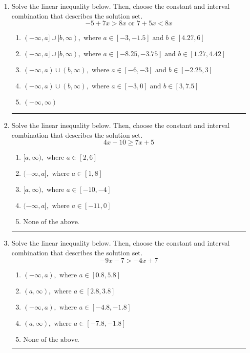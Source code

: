 \documentclass[14pt]{extbook}
\newcommand{\litem}[1]{\item#1\hspace*{-1cm}\rule{\textwidth}{0.4pt}}
\begin{document}
\begin{enumerate}
{\begin{enumerate}[label=\Alph*.]
\end{enumerate} }
\litem{
Solve the linear inequality below. Then, choose the constant and interval combination that describes the solution set.\[ -5 + 7 x > 8 x \text{ or } 7 + 5 x < 8 x \]\begin{enumerate}[label=\Alph*.]
\item \( (-\infty, a] \cup [b, \infty), \text{ where } a \in [-3, -1.5] \text{ and } b \in [4.27, 6] \)
\item \( (-\infty, a] \cup [b, \infty), \text{ where } a \in [-8.25, -3.75] \text{ and } b \in [1.27, 4.42] \)
\item \( (-\infty, a) \cup (b, \infty), \text{ where } a \in [-6, -3] \text{ and } b \in [-2.25, 3] \)
\item \( (-\infty, a) \cup (b, \infty), \text{ where } a \in [-3, 0] \text{ and } b \in [3, 7.5] \)
\item \( (-\infty, \infty) \)

\end{enumerate} }
\litem{
Solve the linear inequality below. Then, choose the constant and interval combination that describes the solution set.\[ 4x -10 \geq 7x + 5 \]\begin{enumerate}[label=\Alph*.]
\item \( [a, \infty), \text{ where } a \in [2, 6] \)
\item \( (-\infty, a], \text{ where } a \in [1, 8] \)
\item \( [a, \infty), \text{ where } a \in [-10, -4] \)
\item \( (-\infty, a], \text{ where } a \in [-11, 0] \)
\item \( \text{None of the above}. \)

\end{enumerate} }
\litem{
Solve the linear inequality below. Then, choose the constant and interval combination that describes the solution set.\[ -9x -7 > -4x + 7 \]\begin{enumerate}[label=\Alph*.]
\item \( (-\infty, a), \text{ where } a \in [0.8, 5.8] \)
\item \( (a, \infty), \text{ where } a \in [2.8, 3.8] \)
\item \( (-\infty, a), \text{ where } a \in [-4.8, -1.8] \)
\item \( (a, \infty), \text{ where } a \in [-7.8, -1.8] \)
\item \( \text{None of the above}. \)


\end{enumerate}}
\end{enumerate}
\end{document}
